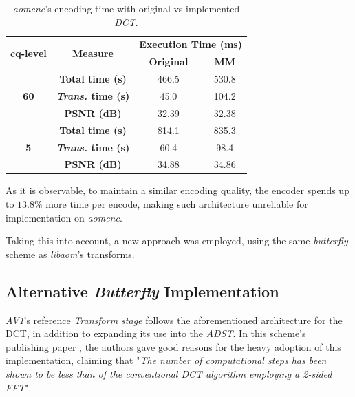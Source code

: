 \begin{table}[!htpb]
    \centering
    \begin{tabular}{cccc} \toprule
        \multirow{2}{*}{\textbf{cq-level}} & \multirow{2}{*}{\textbf{Measure}} &    \multicolumn{2}{c}{\textbf{Execution Time (ms)}} \\
        &   &   \textbf{Original} &      \textbf{MM} \\ \toprule
         \multirow{3}{*}{\textbf{60}}   & \textbf{Total time (s)}       & 466.5     & 530.8 \\
                                        & \textbf{\emph{Trans.} time (s)}    & 45.0      & 104.2 \\
                                        & \textbf{PSNR (dB)}            & 32.39     & 32.38 \\ \hline
         \multirow{3}{*}{\textbf{5}}    & \textbf{Total time (s)}       & 814.1     & 835.3 \\
                                        & \textbf{\emph{Trans.} time (s)}    & 60.4      & 98.4 \\
                                        & \textbf{PSNR (dB)}            & 34.88     & 34.86 \\                                        
         \bottomrule
    \end{tabular}
    \caption{\emph{aomenc}'s encoding time with original vs implemented \emph{DCT}.}
    \label{tab:multresults}
\end{table}

As it is observable, to maintain a similar encoding quality, the encoder spends up to $13.8\%$ more time per encode, making such architecture unreliable for implementation on \emph{aomenc}.

Taking this into account, a new approach was employed, using the same \emph{butterfly} scheme as \emph{libaom}'s transforms.

\subsection{Alternative \emph{Butterfly} Implementation}

\emph{AV1}'s reference \emph{Transform stage} follows the aforementioned architecture for the DCT, in addition to expanding its use into the \emph{ADST}. In this scheme's publishing paper \cite{wen-hsiungchenFastComputationalAlgorithm1977}, the authors gave good reasons for the heavy adoption of this implementation, claiming that "\emph{The number of computational steps has been shown to be less than  of the conventional DCT algorithm employing a 2-sided FFT}". 

